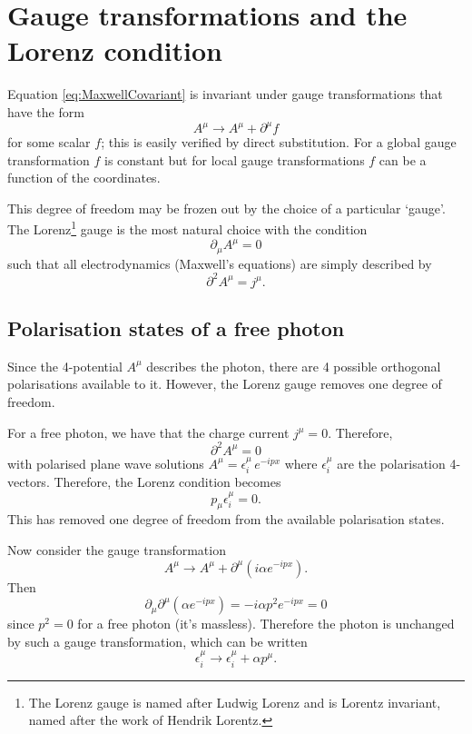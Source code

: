 \section{Gauge transformations and the Lorenz condition}
Equation \eqref{eq:MaxwellCovariant} is invariant under gauge transformations that have the form
\begin{equation}
A^\mu \rightarrow A^\mu + \partial^\mu f
\end{equation}
for some scalar $f$; this is easily verified by direct substitution. For a global gauge transformation $f$ is constant but for local gauge transformations $f$ can be a function of the coordinates.

This degree of freedom may be frozen out by the choice of a particular `gauge'. The Lorenz\footnote{The Lorenz gauge is named after Ludwig Lorenz and is Lorentz invariant, named after the work of Hendrik Lorentz.} gauge is the most natural choice with the condition
\begin{equation}
\partial_\mu A^\mu = 0 \label{eq:LorentzGauge}
\end{equation}
such that all electrodynamics (Maxwell's equations) are simply described by
\begin{equation}\boxed{
\partial^2 A^\mu = j^\mu.
}\end{equation}

\subsection{Polarisation states of a free photon}
Since the 4-potential $A^\mu$ describes the photon, there are 4 possible orthogonal polarisations available to it. However, the Lorenz gauge removes one degree of freedom.

For a free photon, we have that the charge current $j^\mu = 0$. Therefore,
\begin{equation}
\partial^2 A^\mu = 0
\end{equation}
with polarised plane wave solutions $A^\mu = \epsilon^\mu_i \, e^{-ipx}$ where $\epsilon^\mu_i$ are the polarisation 4-vectors. Therefore, the Lorenz condition becomes
\begin{equation}
p_\mu \epsilon^\mu_i = 0.
\end{equation}
This has removed one degree of freedom from the available polarisation states.

Now consider the gauge transformation
\begin{equation}
A^\mu \rightarrow A^\mu + \partial^\mu\left( i\alpha e^{-ipx} \right).
\end{equation}
Then
\begin{equation}
\partial_\mu \partial^\mu \left( \alpha e^{-ipx} \right) = -i \alpha p^2 e^{-ipx} = 0
\end{equation}
since $p^2 = 0$ for a free photon (it's massless). Therefore the photon is unchanged by such a gauge transformation, which can be written
\begin{equation}
\epsilon_i^\mu \rightarrow \epsilon_i^\mu + \alpha p^\mu.
\end{equation}

